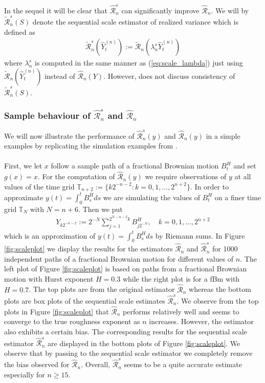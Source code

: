 \documentclass{article}
\begin{document}
In the sequel it will be clear that $\hat{\mathscr{R}}_n^s $ can significantly improve $\hat{\mathscr{R}}_n $. We will by $\widetilde{\mathscr{R}}_n^s (S)$ denote the sequential scale estimator of realized variance which is defined as
\begin{align*}
\widetilde{\mathscr{R}}_n^s (\widehat{Y}_t^{(n)}) := \widetilde{\mathscr{R}}_n (\lambda_n^s \widehat{Y}_t^{(n)})
\end{align*} 
where $\lambda_n^s$ is computed in the same manner as (\ref{eq:scale_lambda}) just using $\widetilde{\mathscr{R}}_n(\widehat{Y}_t^{(n)})$ instead of $\widehat{\mathscr{R}}_n(Y)$. However, \cite{han} does not discuss consistency of $\widetilde{\mathscr{R}}_n^s (S)$.

\subsubsection{Sample behaviour of $\hat{\mathscr{R}}_n^s$ and $\hat{\mathscr{R}}_n$} \label{sec:scale_est_behav}
We will now illustrate the performance of $\hat{\mathscr{R}}_n^s (y)$ and $\hat{\mathscr{R}}_n (y)$ in a simple examples by replicating the simulation examples from \cite{han}.\\\\
First, we let $x$ follow a sample path of a fractional Brownian motion $B^H_t$ and set $g(x)=x$. For the computation of $\hat{\mathscr{R}}_n (y)$ we require observations of $y$ at all values of the time grid $\mathbb{T}_{n+2}:= \{k 2^{-n-2} : k=0,1,...,2^{n+2}\}$. In order to approximate $y(t)=\int_0^t B^H_s ds$ we are simulating the values of $B^H_t$ on a finer time grid $\mathbb{T}_N$ with $N=n+6$. Then we put
\begin{align}
Y_{k2^{-n-2}}:= 2^{-N} \sum_{j=1}^{2^{N-n-2}k} B^H_{j2^{-N}}, \quad k=0,1,...,2^{n+2} \label{eq:scaley}
\end{align}
which is an approximation of $y(t)=\int_0^t B^H_s ds$ by Riemann sums. In Figure \ref{fig:scaleplot} we display the results for the estimators $\hat{\mathscr{R}}_n $ and $\hat{\mathscr{R}}_n^s $ for 1000 independent paths of a fractional Brownian motion for different values of $n$. The left plot of Figure \ref{fig:scaleplot} is based on paths from a fractional Brownian motion with Hurst exponent $H=0.3$ while the right plot is for a fBm with $H=0.7$. The top plots are from the original estimator $\hat{\mathscr{R}}_n$ whereas the bottom plots are box plots of the sequential scale estimates $\hat{\mathscr{R}}_n^s$. We observe from the top plots in Figure \ref{fig:scaleplot} that $\hat{\mathscr{R}}_n$ performs relatively well and seems to converge to the true roughness exponent as $n$ increases. However, the estimator also exhibits a certain bias. The corresponding results for the sequential scale estimator $\hat{\mathscr{R}}_n^s$ are displayed in the bottom plots of Figure \ref{fig:scaleplot}. We observe that by passing to the sequential scale estimator we completely remove the bias observed for $\hat{\mathscr{R}}_n$. Overall, $\hat{\mathscr{R}}_n^s $ seems to be a quite accurate estimate especially for $n\geq 15$. 
\end{document}
